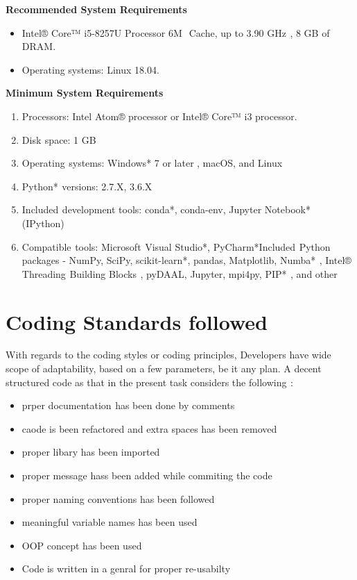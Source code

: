 \documentclass[oneside,12pt]{Classes/VTU}
\begin{document}
	\textbf{Recommended System Requirements}  
	
	\begin{itemize}
		\item Intel® Core™ i5-8257U Processor 6M\tiny\textcolor{white}{B}\normalsize Cache, up to 3.90 GHz\tiny\textcolor{white}{s}\normalsize , 8 GB of DRAM. 
		\item Operating systems:  Linux 18.04.
	\end{itemize}
	
	\textbf{Minimum System Requirements}
	
	\begin{enumerate}
		\item Processors: Intel Atom®\tiny\textcolor{white}{f}\normalsize processor\tiny\textcolor{white}{f}\normalsize or Intel® Core™ i3 processor.
		\item Disk\tiny\textcolor{white}{s}\normalsize space: 1 GB 
		\item Operating\tiny\textcolor{white}{s}\normalsize systems: Windows* 7 or later\tiny\textcolor{white}{f}\normalsize, macOS, and Linux 
		\item Python*\tiny\textcolor{white}{s}\normalsize versions: 2.7.X, 3.6.X 
		\item Included\tiny\textcolor{white}{s}\normalsize development tools: conda*, conda-env, Jupyter Notebook* (IPython) 
		\item Compatible\tiny\textcolor{white}{s}\normalsize tools: Microsoft\tiny\textcolor{white}{s}\normalsize Visual Studio*, PyCharm*Included\tiny\textcolor{white}{s}\normalsize Python packages - NumPy, SciPy, scikit-learn*, pandas, Matplotlib, Numba*\tiny\textcolor{white}{s}\normalsize, Intel® Threading\tiny\textcolor{white}{s}\normalsize Building Blocks\tiny\textcolor{white}{s}\normalsize , pyDAAL, Jupyter, mpi4py, PIP*\tiny\textcolor{white}{s}\normalsize , and other 
	\end{enumerate}
	\section{Coding Standards followed}
	With regards to the coding styles or coding principles, Developers have wide scope of adaptability, based on a few parameters, be it any plan. A decent structured code as that in the present task considers the following\tiny\textcolor{white}{s}\normalsize :
	\begin{itemize}
		\item prper documentation\tiny\textcolor{white}{s}\normalsize has been done by comments
		\item caode is been refactored and extra spaces has been removed 
		\item proper libary has been imported
		\item proper message hass been added while commiting the code 
		\item proper naming conventions has been followed
		\item meaningful variable names has been used
		\item OOP concept has been used 
		\item Code is written in a genral for proper re-usabilty 
	\end{itemize}
	
\end{document}
